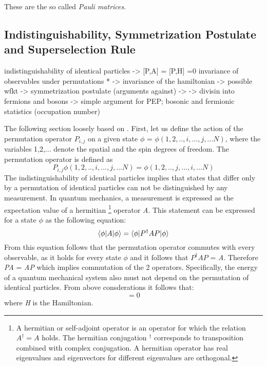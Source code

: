 These are the so called \textit{Pauli matrices}.

\subsection{Indistinguishability, Symmetrization Postulate and Superselection Rule}

indistinguishability of identical particles -> [P,A] = [P,H] =0 invariance of observables under permutations * -> invariance of the hamiltonian -> possible wfkt -> symmetrization postulate (arguments against) -> -> divisin into fermions and bosons -> simple argument for PEP; bosonic and fermionic statistics (occupation number)

The following section loosely based on \cite{Sperandio2008}. First, let us define the action of the permutation operator $P_{i,j}$ on a given state $\phi$ = $\phi(1,2,..,i,...,j,...N)$, where the variables 1,2,... denote the spatial and the spin degrees of freedom. The permutation operator is defined as
\begin{equation}
 P_{i,j}\phi(1,2,..,i,...,j,...N) = \phi(1,2,..,j,...,i,...N)
\end{equation} 
The indistinguishability of identical particles implies that states that differ only by a permutation of identical particles can not be distinguished by any measurement. In quantum mechanics, a measurement is expressed as the expectation value of a hermitian \footnote{A hermitian or self-adjoint operator is an operator for which the relation $A^{\dag} = A$ holds. The hermitian conjugation $^{\dag}$ corresponds to transposition combined with complex conjugation. A hermitian operator has real eigenvalues and eigenvectors for different eigenvalues are orthogonal.} operator \textit{A}. This statement can be expressed for a state $\phi$ as the following equation:
\begin{equation}
 \braket{\phi|A|\phi} = \braket{\phi|P^{\dag}AP|\phi}
\end{equation} 
From this equation follows that the permutation operator commutes with every observable, as it holds for every state $\phi$ and it follows that $P^{\dag}AP$ = \textit{A}. Therefore \textit{PA} = \textit{AP} which implies commutation of the 2 operators. Specifically, the energy of a quantum mechanical system also must not depend on the permutation of identical particles. From above consderations it follows that:
\begin{equation}
 [P,H] = 0
\end{equation} 
where \textit{H} is the Hamiltonian. 


